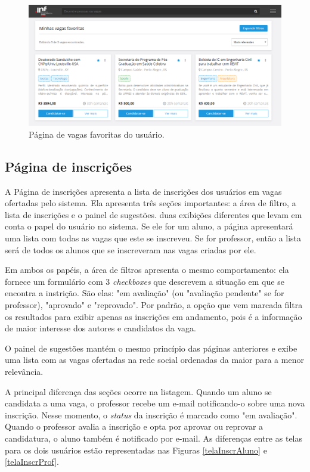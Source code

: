 \begin{figure}[ht]
    \caption{Página de vagas favoritas do usuário.}
       	\begin{center}
            \includegraphics[width=1\textwidth]{figuras/favoritas.png}
        \end{center}
    \label{telaVagaFav}
\end{figure}

\subsection{Página de inscrições}
\label{PDVFunInscricoes}

A Página de inscrições apresenta a lista de inscrições dos usuários em vagas ofertadas pelo sistema. Ela apresenta três seções importantes: a área de filtro, a lista de inscrições e o painel de sugestões. duas exibições diferentes que levam em conta o papel do usuário no sistema. Se ele for um aluno, a página apresentará uma lista com todas as vagas que este se inscreveu. Se for professor, então a lista será de todos os alunos que se inscreveram nas vagas criadas por ele.

Em ambos os papéis, a área de filtros apresenta o mesmo comportamento: ela fornece um formulário com 3 \textit{checkboxes} que descrevem a situação em que se encontra a instrição. São elas: "em avaliação" (ou "avaliação pendente" se for professor), "aprovado" e "reprovado". Por padrão, a opção que vem marcada filtra os resultados para exibir apenas as inscrições em andamento, pois é a informação de maior interesse dos autores e candidatos da vaga.

O painel de sugestões mantém o mesmo princípio das páginas anteriores e exibe uma lista com as vagas ofertadas na rede social ordenadas da maior para a menor relevância.

A principal diferença das seções ocorre na listagem. Quando um aluno se candidata a uma vaga, o professor recebe um e-mail notificando-o sobre uma nova inscrição. Nesse momento, o \textit{status} da inscrição é marcado como "em avaliação". Quando o professor avalia a inscrição e opta por aprovar ou reprovar a candidatura, o aluno também é notificado por e-mail. As diferenças entre as telas para os dois usuários estão representadas nas Figuras \ref{telaInscrAluno} e \ref{telaInscrProf}.


